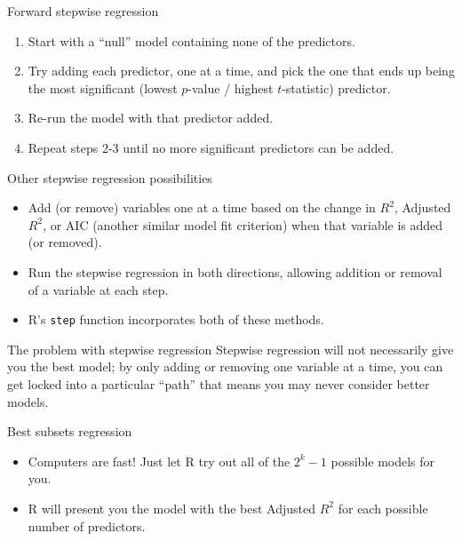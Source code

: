 \documentclass{beamer}\usepackage[]{graphicx}\usepackage[]{color}
\begin{document}
\begin{darkframes}
    \begin{frame}{Forward stepwise regression}
      \begin{enumerate}
        \item Start with a ``null'' model containing none of the predictors.
        \item Try adding each predictor, one at a time, and pick the one that ends up being the most significant (lowest $p$-value / highest $t$-statistic) predictor.
        \item Re-run the model with that predictor added.
        \item Repeat steps 2-3 until no more significant predictors can be added.
      \end{enumerate}
    \end{frame}

    \begin{frame}{Other stepwise regression possibilities}
      \begin{itemize}
        \item Add (or remove) variables one at a time based on the change in $R^2$,  Adjusted $R^2$, or AIC (another similar model fit criterion) when that variable is added (or removed).
        \item Run the stepwise regression in both directions, allowing addition or removal of a variable at each step.
        \item R's \texttt{step} function incorporates both of these methods.
      \end{itemize}
    \end{frame}

    \begin{frame}{The problem with stepwise regression}
      Stepwise regression will not necessarily give you the best model; by only adding or removing one variable at a time, you can get locked into a particular ``path'' that means you may never consider better models.
    \end{frame}

    \begin{frame}{Best subsets regression}
      \begin{itemize}
        \item Computers are fast! Just let R try out all of the $2^k-1$ possible models for you.
        \item R will present you the model with the best Adjusted $R^2$ for each possible number of predictors.
      \end{itemize}
    \end{frame}


\end{darkframes}
\end{document}
